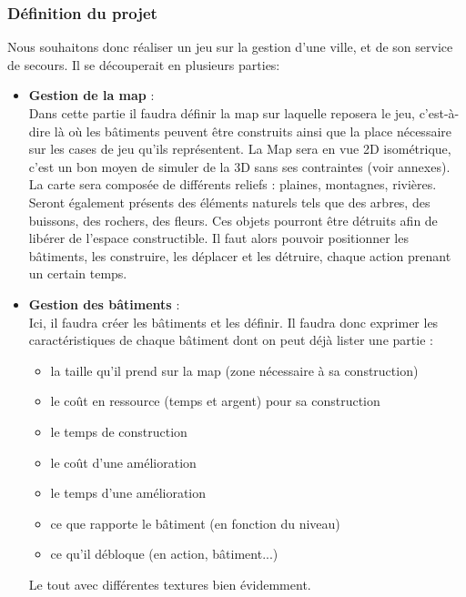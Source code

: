 \subsubsection{Définition du projet}
 Nous souhaitons donc réaliser un jeu sur la gestion d'une ville, et de son service de secours. Il se découperait en plusieurs parties:\\
    \begin{itemize}
        \item \textbf{Gestion de la map} :\\
        Dans cette partie il faudra définir la map sur laquelle reposera le jeu, c'est-à-dire là où les bâtiments peuvent être construits ainsi que la place nécessaire sur les cases de jeu qu'ils représentent. La Map sera en vue 2D isométrique, c'est un bon moyen de simuler de la 3D sans ses contraintes (voir annexes). La carte sera composée de différents reliefs : plaines, montagnes, rivières. Seront également présents des éléments naturels tels que des arbres, des buissons, des rochers, des fleurs. Ces objets pourront être détruits afin de libérer de l'espace constructible. Il faut alors pouvoir positionner les bâtiments, les construire, les déplacer et les détruire, chaque action prenant un certain temps.\\
        
        \item \textbf{Gestion des bâtiments} :\\
        Ici, il faudra créer les bâtiments et les définir. Il faudra donc exprimer les caractéristiques de chaque bâtiment dont on peut déjà lister une partie :
        \begin{itemize}
            \item la taille qu'il prend sur la map (zone nécessaire à sa construction)
            \item le coût en ressource (temps et argent) pour sa construction
            \item le temps de construction
            \item le coût d'une amélioration
            \item le temps d'une amélioration
            \item ce que rapporte le bâtiment (en fonction du niveau)
            \item ce qu'il débloque (en action, bâtiment...)
        \end{itemize}
        Le tout avec différentes textures bien évidemment.\\


\end{itemize}
